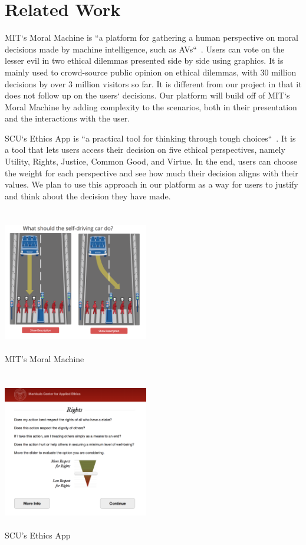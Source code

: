 \documentclass[12pt,journal,compsoc]{IEEEtran}
\begin{document}
\section{Related Work}
MIT`s Moral Machine is ``a platform for gathering a human perspective on moral decisions made by machine intelligence, such as AVs``~\cite{mit}. Users can vote on the lesser evil in two ethical dilemmas presented side by side using graphics. It is mainly used to crowd-source public opinion on ethical dilemmas, with 30 million decisions by over 3 million visitors so far. It is different from our project in that it does not follow up on the users` decisions. Our platform will build off of MIT`s Moral Machine by adding complexity to the scenarios, both in their presentation and the interactions with the user.

SCU`s Ethics App is ``a practical tool for thinking through tough choices``~\cite{scu}. It is a tool that lets users access their decision on five ethical perspectives, namely Utility, Rights, Justice, Common Good, and Virtue. In the end, users can choose the weight for each perspective and see how much their decision aligns with their values. We plan to use this approach in our platform as a way for users to justify and think about the decision they have made.


\newpage

\appendices

\section{}
\vspace{0.5cm}
\includegraphics[width=2.5in]{images/proposal-mit.png}
\\\\ MIT's Moral Machine

\section{}
\vspace{0.5cm}
\includegraphics[width=2.5in]{images/proposal-scu.png}
\\\\ SCU's Ethics App
\end{document}

